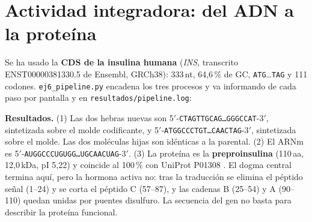 \documentclass[11pt,a4paper]{article}
\newcommand{\sq}[1]{\texttt{#1}}
\begin{document}
\section{Actividad integradora: del ADN a la proteína}
Se ha usado la \textbf{CDS de la insulina humana} (\textit{INS}, transcrito ENST00000381330.5 de Ensembl, GRCh38): 333\,nt, 64,6\,\% de GC, \sq{ATG}\dots\sq{TAG} y 111 codones. \sq{ej6\_pipeline.py} encadena los tres procesos y va informando de cada paso por pantalla y en \sq{resultados/pipeline.log}:

\begin{center}
\end{center}

\textbf{Resultados.} (1) Las dos hebras nuevas son 5$'$-\sq{CTAGTTGCAG\dots GGGCCAT}-3$'$, sintetizada sobre el molde codificante, y 5$'$-\sq{ATGGCCCTGT\dots CAACTAG}-3$'$, sintetizada sobre el molde. Las dos moléculas hijas son idénticas a la parental. (2) El ARNm es 5$'$-\sq{AUGGCCCUGUGG\dots UGCAACUAG}-3$'$. (3) La proteína es la \textbf{preproinsulina} (110\,aa, 12,0\,kDa, pI 5,22) y coincide al 100\,\% con UniProt P01308 \cite{uniprot}. El dogma central termina aquí, pero la hormona activa no: tras la traducción se elimina el péptido señal (1--24) y se corta el péptido C (57--87), y las cadenas B (25--54) y A (90--110) quedan unidas por puentes disulfuro. La secuencia del gen no basta para describir la proteína funcional.
\end{document}
